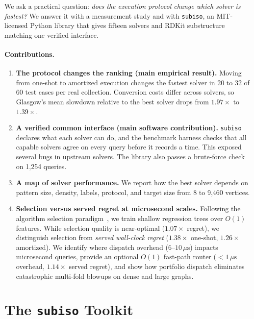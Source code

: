 \documentclass[11pt,a4paper]{article}
\begin{document}
We ask a practical question: \emph{does the execution protocol change which solver is fastest?} We answer it with a measurement study and with \texttt{subiso}, an MIT-licensed Python library that gives fifteen solvers and RDKit substructure matching one verified interface.

\paragraph{Contributions.}
\begin{enumerate}
    \item \textbf{The protocol changes the ranking (main empirical result).} Moving from one-shot to amortized execution changes the fastest solver in 20 to 32 of 60 test cases per real collection. Conversion costs differ across solvers, so Glasgow's mean slowdown relative to the best solver drops from $1.97\times$ to $1.39\times$.
    \item \textbf{A verified common interface (main software contribution).} \texttt{subiso} declares what each solver can do, and the benchmark harness checks that all capable solvers agree on every query before it records a time. This exposed several bugs in upstream solvers. The library also passes a brute-force check on 1,254 queries.
    \item \textbf{A map of solver performance.} We report how the best solver depends on pattern size, density, labels, protocol, and target size from 8 to 9,460 vertices.
    \item \textbf{Selection versus served regret at microsecond scales.} Following the algorithm selection paradigm~\cite{rice1976algorithm,xu2008satzilla,kotthoff2016portfolios,kuraya2026sublime}, we train shallow regression trees over $O(1)$ features. While selection quality is near-optimal ($1.07\times$ regret), we distinguish selection from \emph{served wall-clock regret} ($1.38\times$ one-shot, $1.26\times$ amortized). We identify where dispatch overhead ($6\text{--}10\,\mu\text{s}$) impacts microsecond queries, provide an optional $O(1)$ fast-path router ($<1\,\mu\text{s}$ overhead, $1.14\times$ served regret), and show how portfolio dispatch eliminates catastrophic multi-fold blowups on dense and large graphs.
\end{enumerate}

\section{The \texttt{subiso} Toolkit}
\end{document}
